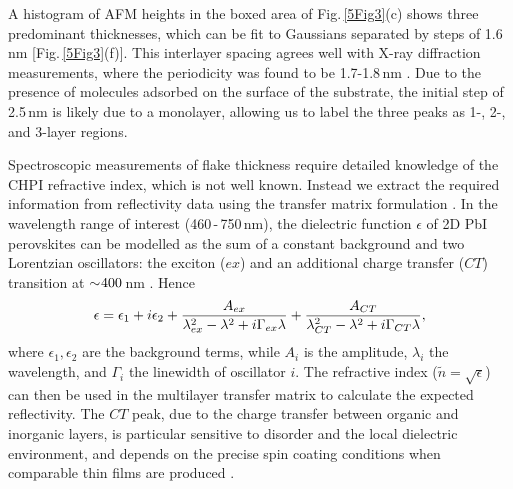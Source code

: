 A histogram of AFM heights in the boxed area of Fig.\,\ref{5Fig3}(c) shows three predominant thicknesses, which can be fit to Gaussians separated by steps of 1.6\,nm [Fig.\,\ref{5Fig3}(f)]. This interlayer spacing agrees well with X-ray diffraction measurements, where the periodicity was found to be 1.7-1.8\,nm \cite{Billing2006b, Pradeesh2009a}. Due to the presence of molecules adsorbed on the surface of the substrate, the initial step of 2.5\,nm is likely due to a monolayer, allowing us to label the three peaks as 1-, 2-, and 3-layer regions.  

Spectroscopic measurements of flake thickness require detailed knowledge of the CHPI refractive index, which is not well known. Instead we extract the required information from reflectivity data using the transfer matrix formulation \cite{Born1999}. In the wavelength range of interest (460\,-\,750\,nm), the dielectric function $\epsilon$ of 2D PbI perovskites can be modelled as the sum of a constant background and two Lorentzian oscillators: the exciton ($ex$) and an additional charge transfer ($CT$) transition at $\sim\negmedspace400$\,nm \cite{VijayaPrakash2009, Fujisawa2004, Fujisawa2005, Fujisawa2007, Mitzi1999a, Zhang2010}. Hence
\begin{equation}
\centering
\epsilon = \epsilon_1+i\epsilon_2+\frac{A_{ex}}{\lambda_{ex}^2-\lambda^2+i\Gamma_{ex}\lambda}+\frac{A_{CT}}{\lambda_{CT}^2-\lambda^2+i\Gamma_{CT}\lambda} ,
\label{CHPI_model}
\end{equation}
where $\epsilon_1, \epsilon_2$ are the background terms, while $A_i$ is the amplitude, $\lambda_i$ the wavelength, and $\Gamma_i$ the linewidth of oscillator $i$. The refractive index ($\tilde{n} = \sqrt{\epsilon}$) can then be used in the multilayer transfer matrix to calculate the expected reflectivity. The $CT$ peak, due to the charge transfer between organic and inorganic layers, is particular sensitive to disorder and the local dielectric environment, and depends on the precise spin coating conditions when comparable thin films are produced \cite{VijayaPrakash2009}. 

